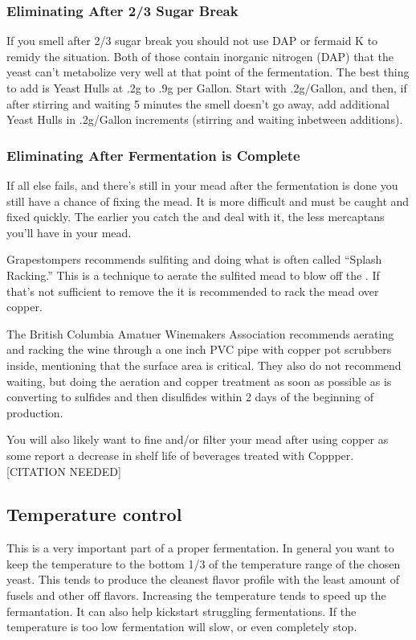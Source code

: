 \documentclass{article}
\begin{document}
  \subsubsection{Eliminating After 2/3 Sugar Break} 
   If you smell  after 2/3 sugar break you should not use DAP or fermaid K to remidy the situation. Both of those contain inorganic nitrogen (DAP) 
   that the yeast can't metabolize very well at that point of the fermentation. The best thing to add is Yeast Hulls at .2g to .9g per Gallon. Start with .2g/Gallon, and
   then, if after stirring and waiting 5 minutes the  smell doesn't go away, add additional Yeast Hulls in .2g/Gallon increments (stirring and waiting inbetween
   additions).

  \subsubsection{Eliminating After Fermentation is Complete}
   If all else fails, and there's still  in your mead after the fermentation is done you still have a chance of fixing the mead. It is more difficult and must 
   be caught and fixed quickly. The earlier you catch the  and deal with it, the less mercaptans you'll have in your mead. 

   Grapestompers\cite{grapestompers-H2S}
   recommends sulfiting and doing what is often called  ``Splash Racking.'' This is a technique to aerate the sulfited mead to blow off the . If that's not
   sufficient to remove the  it is recommended to rack the mead over copper. 

   The British Columbia Amatuer Winemakers Association\cite{bcawa-H2S} recommends
   aerating and racking the wine through a one inch PVC pipe with copper pot scrubbers inside, mentioning that the surface area is critical. They also do not recommend
   waiting, but doing the aeration and copper treatment as soon as possible as  is converting to sulfides and then disulfides within 2 days of the 
   beginning of  production.

   You will also likely want to fine and/or filter your mead after using copper as some report a decrease in shelf life of beverages treated with Coppper.[CITATION NEEDED]

 \subsection{Temperature control}
  This is a very important part of a proper fermentation. In general you want to keep the temperature to the bottom 1/3 of the temperature range of the chosen yeast. 
  This tends to produce the cleanest flavor profile with the least amount of fusels and other off flavors. Increasing the temperature tends to speed up the fermantation.
  It can also help kickstart struggling fermentations. If the temperature is too low fermentation will slow, or even completely stop.
\end{document}

